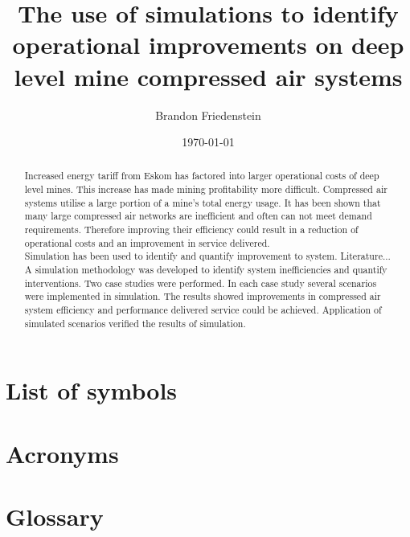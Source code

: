 \documentclass[12pt, english, oneside, singlespacing, open=any]{report}
\begin{document}
	
\begin{titlepage}
	\title{The use of simulations to identify
		operational improvements on deep level mine compressed
		air systems}
	\date{\today}
	\author{Brandon Friedenstein}
	\maketitle
\end{titlepage}

\begin{abstract}
	\thispagestyle{plain}
	\setcounter{page}{2}
	
	Increased energy tariff from Eskom has factored into larger operational costs of deep level mines. This increase has made mining profitability more difficult.  Compressed air systems utilise a large portion of a mine's total energy usage. It has been shown that many large compressed air networks are inefficient and often can not meet demand requirements. Therefore improving their efficiency could result in a reduction of operational costs and an improvement in service delivered. \\
	Simulation has been used to identify and quantify improvement to system. Literature... \\
		A simulation methodology was developed to identify system inefficiencies and quantify interventions. Two case studies were performed. In each case study several scenarios were implemented in simulation. The results showed improvements in compressed air system efficiency and performance delivered service could be achieved. Application of simulated scenarios verified the results of simulation. 
	
\end{abstract}

\setcounter{page}{3}
\tableofcontents



\chapter*{List of symbols}

\chapter*{Acronyms}

\chapter*{Glossary}









\end{document}
